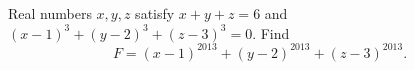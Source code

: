 Real numbers $x,y,z$ satisfy $x+y+z=6$ and $(x-1)^3+(y-2)^3+(z-3)^3=0$. Find
\[
F=(x-1)^{2013}+(y-2)^{2013}+(z-3)^{2013}.
\]
